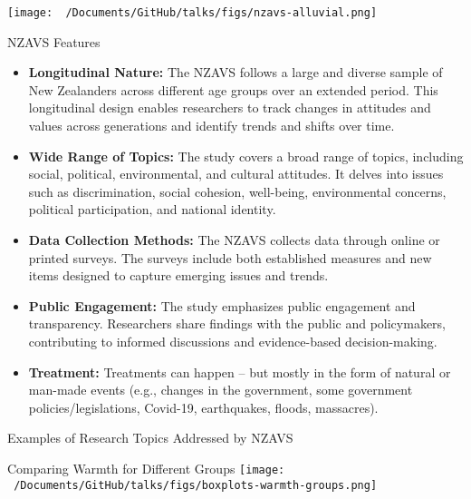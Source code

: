 \documentclass[
  ignorenonframetext,
  aspectratio=169,
]{beamer}
\providecommand{\tightlist}{%
  \setlength{\itemsep}{0pt}\setlength{\parskip}{0pt}}\usepackage{longtable,booktabs,array}
\begin{document}
\begin{frame}
\texttt{[image: ~/Documents/GitHub/talks/figs/nzavs-alluvial.png]}
\end{frame}

\begin{frame}{NZAVS Features}
\label{nzavs-features}
\begin{itemize}[<+->]
\tightlist
\item
  \textbf{Longitudinal Nature:} The NZAVS follows a large and diverse
  sample of New Zealanders across different age groups over an extended
  period. This longitudinal design enables researchers to track changes
  in attitudes and values across generations and identify trends and
  shifts over time.
\item
  \textbf{Wide Range of Topics:} The study covers a broad range of
  topics, including social, political, environmental, and cultural
  attitudes. It delves into issues such as discrimination, social
  cohesion, well-being, environmental concerns, political participation,
  and national identity.
\item
  \textbf{Data Collection Methods:} The NZAVS collects data through
  online or printed surveys. The surveys include both established
  measures and new items designed to capture emerging issues and trends.
\end{itemize}
\end{frame}

\begin{frame}
\begin{itemize}[<+->]
\tightlist
\item
  \textbf{Public Engagement:} The study emphasizes public engagement and
  transparency. Researchers share findings with the public and
  policymakers, contributing to informed discussions and evidence-based
  decision-making.
\item
  \textbf{Treatment:} Treatments can happen -- but mostly in the form of
  natural or man-made events (e.g., changes in the government, some
  government policies/legislations, Covid-19, earthquakes, floods,
  massacres).
\end{itemize}
\end{frame}

\begin{frame}{Examples of Research Topics Addressed by NZAVS}
\label{examples-of-research-topics-addressed-by-nzavs}
\end{frame}

\begin{frame}{Comparing Warmth for Different Groups}
\label{comparing-warmth-for-different-groups}
\texttt{[image: ~/Documents/GitHub/talks/figs/boxplots-warmth-groups.png]}
\end{frame}
\end{document}
